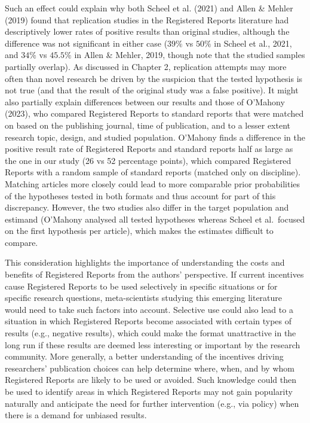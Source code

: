 \documentclass[
  ,man,mask,floatsintext]{apa6}
\begin{document}
Such an effect could explain why both Scheel et al. (2021) and Allen \& Mehler (2019) found that replication studies in the Registered Reports literature had descriptively lower rates of positive results than original studies, although the difference was not significant in either case (\(39\%\) vs \(50\%\) in Scheel et al., 2021, and \(34\%\) vs \(45.5\%\) in Allen \& Mehler, 2019, though note that the studied samples partially overlap).
As discussed in Chapter 2, replication attempts may more often than novel research be driven by the suspicion that the tested hypothesis is not true (and that the result of the original study was a false positive).
It might also partially explain differences between our results and those of O'Mahony (2023), who compared Registered Reports to standard reports that were matched on based on the publishing journal, time of publication, and to a lesser extent research topic, design, and studied population.
O'Mahony finds a difference in the positive result rate of Registered Reports and standard reports half as large as the one in our study (26 vs 52 percentage points), which compared Registered Reports with a random sample of standard reports (matched only on discipline).
Matching articles more closely could lead to more comparable prior probabilities of the hypotheses tested in both formats and thus account for part of this discrepancy.
However, the two studies also differ in the target population and estimand (O'Mahony analysed all tested hypotheses whereas Scheel et al.~focused on the first hypothesis per article), which makes the estimates difficult to compare.

This consideration highlights the importance of understanding the costs and benefits of Registered Reports from the authors' perspective.
If current incentives cause Registered Reports to be used selectively in specific situations or for specific research questions, meta-scientists studying this emerging literature would need to take such factors into account.
Selective use could also lead to a situation in which Registered Reports become associated with certain types of results (e.g., negative results), which could make the format unattractive in the long run if these results are deemed less interesting or important by the research community.
More generally, a better understanding of the incentives driving researchers' publication choices can help determine where, when, and by whom Registered Reports are likely to be used or avoided.
Such knowledge could then be used to identify areas in which Registered Reports may not gain popularity naturally and anticipate the need for further intervention (e.g., via policy) when there is a demand for unbiased results.
\end{document}
